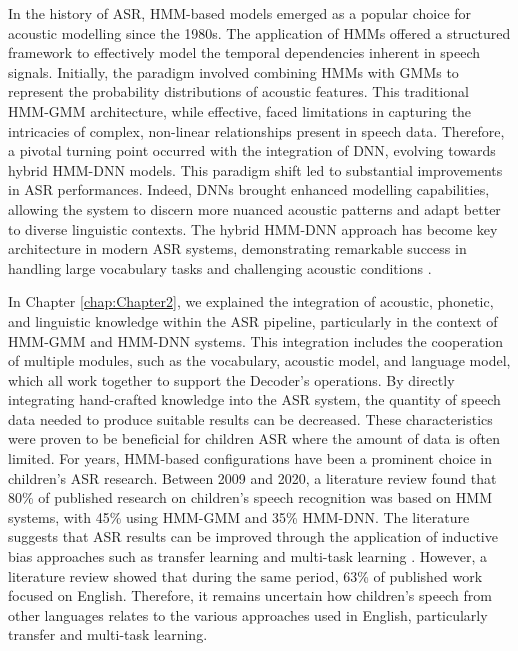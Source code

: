 \label{chap:Chapter3}
\cleardoublepage

In the history of \ac{ASR}, \ac{HMM}-based models emerged as a popular choice for acoustic modelling since the 1980s. The application of \acp{HMM} offered a structured framework to effectively model the temporal dependencies inherent in speech signals. Initially, the paradigm involved combining \acp{HMM} with \acp{GMM} to represent the probability distributions of acoustic features. This traditional \ac{HMM-GMM} architecture, while effective, faced limitations in capturing the intricacies of complex, non-linear relationships present in speech data. Therefore, a pivotal turning point occurred with the integration of \ac{DNN}, evolving towards hybrid \ac{HMM-DNN} models. This paradigm shift led to substantial improvements in \ac{ASR} performances. Indeed, \acp{DNN} brought enhanced modelling capabilities, allowing the system to discern more nuanced acoustic patterns and adapt better to diverse linguistic contexts. The hybrid \ac{HMM-DNN} approach has become key architecture in modern \ac{ASR} systems, demonstrating remarkable success in handling large vocabulary tasks and challenging acoustic conditions \cite{hmm-dnn}. 

In Chapter \ref{chap:Chapter2}, we explained the integration of acoustic, phonetic, and linguistic knowledge within the \ac{ASR} pipeline, particularly in the context of \ac{HMM-GMM} and \ac{HMM-DNN} systems. This integration includes the cooperation of multiple modules, such as the vocabulary, acoustic model, and language model, which all work together to support the Decoder's operations. By directly integrating hand-crafted knowledge into the \ac{ASR} system, the quantity of speech data needed to produce suitable results can be decreased. These characteristics were proven to be beneficial for children \ac{ASR} where the amount of data is often limited. For years, \ac{HMM}-based configurations have been a prominent choice in children's \ac{ASR} research. Between 2009 and 2020, a literature review \cite{big_review_childASR} found that 80\% of published research on children's speech recognition was based on \ac{HMM} systems, with 45\% using \ac{HMM-GMM} and 35\% \ac{HMM-DNN}. The literature suggests that \ac{ASR} results can be improved through the application of inductive bias approaches such as transfer learning and multi-task learning \cite{TransferLF}. However, a literature review \cite{big_review_childASR} showed that during the same period, 63\% of published work focused on English. Therefore, it remains uncertain how children's speech from other languages relates to the various approaches used in English, particularly transfer and multi-task learning.

